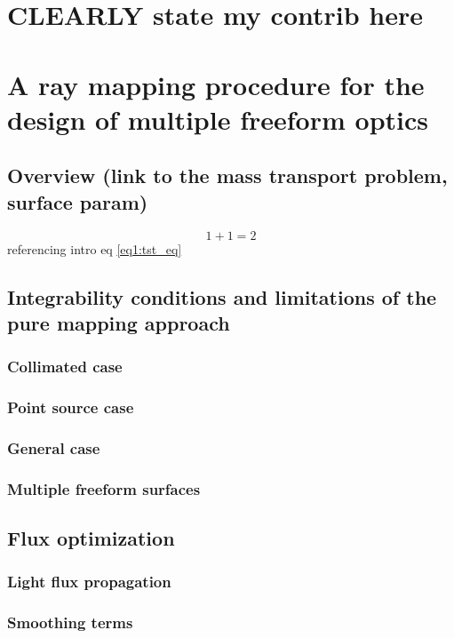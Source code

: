 \chapter{CLEARLY state my contrib here}

\chapter{A ray mapping procedure for the design of multiple freeform optics}
\label{ch:core}

\section{Overview (link to the mass transport problem, surface param)}
\begin{equation}
\label{eq3:tst_eq}
1+1=2
\end{equation}
referencing intro eq \eqref{eq1:tst_eq}


\section{Integrability conditions and limitations of the pure mapping approach}
\subsection{Collimated case}
\subsection{Point source case}
\subsection{General case}
\subsection{Multiple freeform surfaces}

\section{Flux optimization}
\subsection{Light flux propagation}
\subsection{Smoothing terms}


